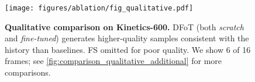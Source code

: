 \begin{figure}[t]
    \centering
    \texttt{[image: figures/ablation/fig\_qualitative.pdf]}
    \vskip -0.06in
    \caption{
        \textbf{Qualitative comparison on Kinetics-600.}  DFoT (both \emph{scratch} and \emph{fine-tuned}) generates higher-quality samples consistent with the history than baselines. FS omitted for poor quality. We show 6 of 16 frames; see \cref{fig:comparison_qualitative_additional} for more comparisons. 
    }
    \label{fig:comparison_qualitative}
    \vspace{-15pt}
\end{figure}
